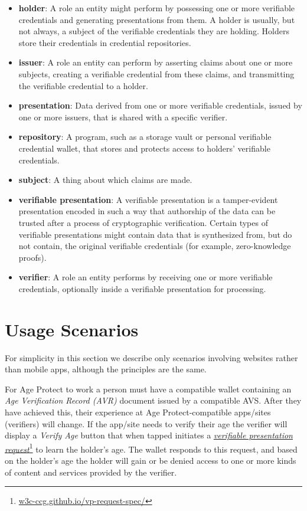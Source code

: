 \documentclass[11pt, oneside]{article}   	%
\newcommand{\hyperfootnote}[1][]{\def\ArgI{{#1}}\hyperfootnoteRelay}
\newcommand\hyperfootnoteRelay[2][]{\href{#1#2}{\ArgI}\footnote{\href{#1#2}{#2}}}
\begin{document}
\begin{itemize}
	\item \textbf{holder}: A role an entity might perform by possessing one or more verifiable credentials and generating presentations from them. A holder is usually, but not always, a subject of the verifiable credentials they are holding. Holders store their credentials in credential repositories.
	\item \textbf{issuer}: A role an entity can perform by asserting claims about one or more subjects, creating a verifiable credential from these claims, and transmitting the verifiable credential to a holder.
	\item \textbf{presentation}: Data derived from one or more verifiable credentials, issued by one or more issuers, that is shared with a specific verifier.
	\item \textbf{repository}: A program, such as a storage vault or personal verifiable credential wallet, that stores and protects access to holders' verifiable credentials.
	\item \textbf{subject}: A thing about which claims are made. 
	\item \textbf{verifiable presentation}: A verifiable presentation is a tamper-evident presentation encoded in such a way that authorship of the data can be trusted after a process of cryptographic verification. Certain types of verifiable presentations might contain data that is synthesized from, but do not contain, the original verifiable credentials (for example, zero-knowledge proofs).
	\item \textbf{verifier}: A role an entity performs by receiving one or more verifiable credentials, optionally inside a verifiable presentation for processing. 
\end{itemize}	

\section{Usage Scenarios} 

For simplicity in this section we describe only scenarios involving websites rather than mobile apps, although the principles are the same.

For Age Protect to work a person must have a compatible wallet containing an \emph{Age Verification Record (AVR)} document issued by a compatible AVS. After they have achieved this, their experience at Age Protect-compatible apps/sites (verifiers) will change. If the app/site needs to verify their age the verifier will display a \emph{Verify Age} button that when tapped initiates a \hyperfootnote[\emph{verifiable presentation request}][https://]{w3c-ccg.github.io/vp-request-spec/} to learn the holder's age. The wallet responds to this request, and based on the holder's age the holder will gain or be denied access to one or more kinds of content and services provided by the verifier. 
\end{document}
